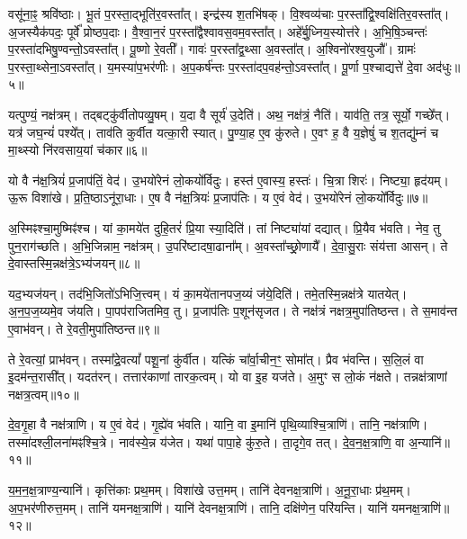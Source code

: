 वसू॑ना॒ꣴ॒ श्रवि॑ष्ठाः।
भू॒तं प॒रस्ता॒द्भूति॑र॒वस्ता᳚त्।
इन्द्र॑स्य श॒तभि॑षक्।
वि॒श्वव्य॑चाः प॒रस्ता᳚द्वि॒श्वक्षि॑तिर॒वस्ता᳚त्।
अ॒जस्यैक॑पदः॒ पूर्वे᳚ प्रोष्ठप॒दाः।
वै॒श्वा॒न॒रं प॒रस्ता᳚द्वैश्वावस॒वम॒\-वस्ता᳚त्।
अहे᳚र्बु॒ध्निय॒स्यो\-त्त॑रे।
अ॒भि॒षि॒ञ्चन्तः॑ प॒रस्ता॑दभि\-षु॒ण्वन्तो॒\-ऽवस्ता᳚त्।
पू॒ष्णो रे॒वती᳚।
गावः॑ प॒रस्ता᳚द्व॒थ्सा अ॒वस्ता᳚त्।
अ॒श्विनो॑रश्व॒युजौ᳚।
ग्रामः॑ प॒रस्ता॒थ्सेना॒\-ऽवस्ता᳚त्।
य॒मस्या॑प॒भर॑णीः।
अ॒प॒कर्\mbox{}ष॑न्तः प॒रस्ता॑दप॒वह॑न्तो॒\-ऽवस्ता᳚त्।
पू॒र्णा प॒श्चाद्यत्ते॑ दे॒वा अद॑धुः॥५॥\anuvakamend[आ॒र्द्रम॒वस्ता॒द्वह॑माना अ॒वस्ता॑द॒भ्यारू॑ढम॒वस्ता॒त्पन्था॑ अ॒वस्ता᳚द्व॒थ्सा अ॒वस्ता॒त्पञ्च॑ च]

यत्पुण्यं॒ नक्ष॑त्रम्।
तद्बट्कु॑र्वीतोपव्यु॒षम्।
य॒दा वै सूर्य॑ उ॒देति॑।
अथ॒ नक्ष॑त्रं॒ नैति॑।
याव॑ति॒ तत्र॒ सूर्यो॒ गच्छे᳚त्।
यत्र॑ जघ॒न्यं॑ पश्ये᳚त्।
ताव॑ति कुर्वीत यत्का॒री स्यात्।
पु॒ण्या॒ह ए॒व कु॑रुते।
ए॒वꣳ ह॒ वै य॒ज्ञेषुं॑ च श॒तद्यु॑म्नं च मा॒थ्स्यो नि॑रवसाय॒यां च॑कार॥६॥

यो वै न॑क्ष॒त्रियं॑ प्र॒जा\-प॑तिं॒ वेद॑।
उ॒भयो॑रेनं लो॒कयो᳚र्विदुः।
हस्त॑ ए॒वास्य॒ हस्तः॑।
चि॒त्रा शिरः॑।
निष्ट्या॒ हृद॑यम्।
ऊ॒रू विशा॑खे।
प्र॒ति॒ष्ठा\-ऽनू॑रा॒धाः।
ए॒ष वै न॑क्ष॒त्रियः॑ प्र॒जा\-प॑तिः।
य ए॒वं वेद॑।
उ॒भयो॑रेनं लो॒कयो᳚र्विदुः॥७॥

अ॒स्मिꣴश्चा॒मुष्मिꣴ॑श्च।
यां का॒मये॑त दुहि॒तरं॑ प्रि॒या स्या॒दिति॑।
तां निष्ट्या॑यां दद्यात्।
प्रि॒यैव भ॑वति।
नेव॒ तु पुन॒राग॑च्छति।
अ॒भि॒जिन्नाम॒ नक्ष॑त्रम्।
उ॒परि॑ष्टादषा॒ढाना᳚म्।
अ॒वस्ता᳚च्छ्रो॒णायै᳚।
दे॒वा॒सु॒राः संय॑त्ता आसन्।
ते दे॒वास्तस्मि॒न्नक्ष॑त्रे॒\-ऽभ्य॑जयन्॥८॥

यद॒भ्यज॑यन्।
तद॑भि॒जितो॑\-ऽभिजि॒त्त्वम्।
यं का॒मये॑तानप\-ज॒य्यं ज॑ये॒दिति॑।
तमे॒तस्मि॒न्नक्ष॑त्रे यातयेत्।
अ॒न॒प॒ज॒य्यमे॒व ज॑यति।
पा॒पप॑राजितमिव॒ तु।
प्र॒जा\-प॑तिः प॒शून॑\-सृजत।
ते नक्ष॑त्रं नक्षत्र॒मुपा॑तिष्ठन्त।
ते स॒माव॑न्त ए॒वाभ॑वन्।
ते रे॒वती॒मुपा॑तिष्ठन्त॥९॥

ते रे॒वत्यां॒ प्राभ॑वन्।
तस्मा᳚द्रे॒वत्यां᳚ पशू॒नां कु॑र्वीत।
यत्किं चा᳚र्वा॒चीन॒ꣳ॒ सोमा᳚त्।
प्रैव भ॑वन्ति।
स॒लि॒लं वा इ॒दम॑न्त॒रासी᳚त्।
यदत॑रन्।
तत्तार॑काणां तारक॒त्वम्।
यो वा इ॒ह यज॑ते।
अ॒मुꣳ स लो॒कं न॑क्षते।
तन्नक्ष॑त्राणां नक्षत्र॒त्वम्॥१०॥

दे॒व॒गृ॒हा वै नक्ष॑त्राणि।
य ए॒वं वेद॑।
गृ॒ह्ये॑व भ॑वति।
यानि॒ वा इ॒मानि॑ पृथि॒व्याश्चि॒त्राणि॑।
तानि॒ नक्ष॑त्राणि।
तस्मा॑दश्ली॒लना॑मꣴश्चि॒त्रे।
नाव॑स्ये॒न्न य॑जेत।
यथा॑ पापा॒हे कु॑रु॒ते।
ता॒दृगे॒व तत्।
दे॒व॒न॒क्ष॒त्राणि॒ वा अ॒न्यानि॑॥११॥

य॒म॒न॒क्ष॒त्राण्य॒न्यानि॑।
कृत्ति॑काः प्रथ॒मम्।
विशा॑खे उत्त॒मम्।
तानि॑ देवनक्ष॒त्राणि॑।
अ॒नू॒रा॒धाः प्र॑थ॒मम्।
अ॒प॒भर॑णीरुत्त॒मम्।
तानि॑ यमनक्ष॒त्राणि॑।
यानि॑ देवनक्ष॒त्राणि॑।
तानि॒ दक्षि॑णेन॒ परि॑यन्ति।
यानि॑ यमनक्ष॒त्राणि॑॥१२॥


